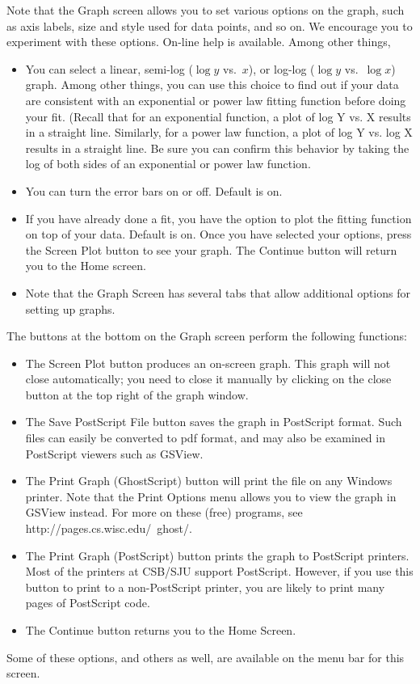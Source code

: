 Note that the Graph screen allows you to set various options on the graph, such as axis
labels, size and style used for data points, and so on.  We encourage
you to experiment with these options.  On-line help is available.  Among other things,

\begin{itemize}

\item You can select a linear, semi-log ($\log y$ vs.\ $x$), or log-log
($\log y$ vs.\ $\log x$) graph.  Among other things, you can use this choice to
find out if your data are consistent with an exponential or power law fitting function before doing your fit.  (Recall that for an exponential function, a plot of log Y vs. X results in a straight line.  Similarly, for a power law function, a plot of log Y vs. log X results in a straight line.
Be sure you can confirm this behavior by taking the log of both sides of an exponential or power law function.
%
\item You can turn the error bars on or off.  Default is on.
%
\item If you have already done a fit, you have the option to plot
the
fitting function on top of your data.  Default is on.
Once you have selected your options, press the Screen Plot button to see your graph.  The Continue button will return you to the Home screen.
\item Note that the Graph Screen has several tabs that allow additional options for setting up graphs.
\end{itemize}

The buttons at the bottom on the Graph screen perform the following functions:
\begin{itemize}
\item The Screen Plot button produces an on-screen graph.  This graph will not close automatically; you need to close it manually by clicking on the close button at the top right of the graph window.
%
\item The Save PostScript File button saves the graph in PostScript format.  Such files can easily be converted to pdf format, and may also be examined in PostScript viewers such as GSView. 
\item The Print Graph (GhostScript) button will print the file on any Windows printer.  Note that the Print Options menu allows you to view the graph in GSView instead.  For more on these (free) programs, see http://pages.cs.wisc.edu/~ghost/.
\item The Print Graph (PostScript) button prints the graph to PostScript printers.  Most of the printers at CSB/SJU support PostScript.  However, if you use this button to print to a non-PostScript printer, you are likely to print many pages of PostScript code.
\item The Continue button returns you to the Home Screen.
\end{itemize}
Some of these options, and others as well, are available on the menu
bar for this screen.

